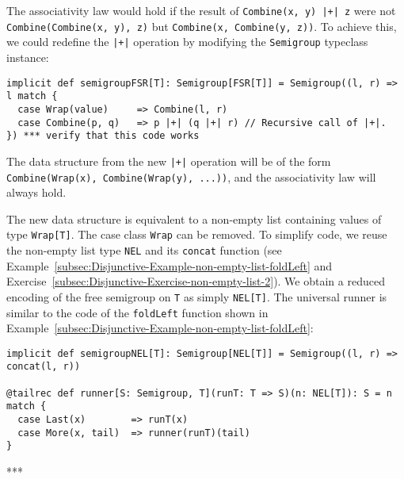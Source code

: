 The associativity law would hold if the result of \lstinline!Combine(x, y) |+| z!
were not \lstinline!Combine(Combine(x, y), z)!
but \lstinline!Combine(x, Combine(y, z))!.
To achieve this, we could redefine the \lstinline!|+|!
operation by modifying the \lstinline!Semigroup!
typeclass instance:
\begin{lstlisting}
implicit def semigroupFSR[T]: Semigroup[FSR[T]] = Semigroup((l, r) => l match {
  case Wrap(value)     => Combine(l, r)
  case Combine(p, q)   => p |+| (q |+| r) // Recursive call of |+|.
}) *** verify that this code works
\end{lstlisting}
The data structure from the new \lstinline!|+|!
operation will be of the form \lstinline!Combine(Wrap(x), Combine(Wrap(y), ...))!,
and the associativity law will always hold. 

The new data structure is equivalent to a non-empty list containing
values of type \lstinline!Wrap[T]!.
The case class \lstinline!Wrap!
can be removed. To simplify code, we  reuse the non-empty list type
\lstinline!NEL! and its
\lstinline!concat! function
(see Example~\ref{subsec:Disjunctive-Example-non-empty-list-foldLeft}
and Exercise~\ref{subsec:Disjunctive-Exercise-non-empty-list-2}).
We obtain a reduced encoding of the free semigroup on \lstinline!T!
as simply \lstinline!NEL[T]!.
The universal runner is similar to the code of the \lstinline!foldLeft!
function shown in Example~\ref{subsec:Disjunctive-Example-non-empty-list-foldLeft}:
\begin{lstlisting}
implicit def semigroupNEL[T]: Semigroup[NEL[T]] = Semigroup((l, r) => concat(l, r))
 
@tailrec def runner[S: Semigroup, T](runT: T => S)(n: NEL[T]): S = n match {
  case Last(x)        => runT(x)
  case More(x, tail)  => runner(runT)(tail)
}
\end{lstlisting}
{*}{*}{*}

